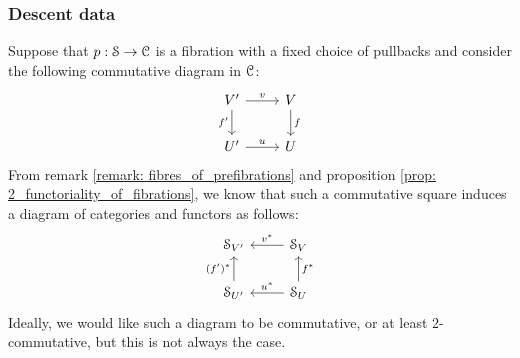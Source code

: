         \subsubsection{Descent data}
            Suppose that $p: \mathcal{S} \to \mathcal{C}$ is a fibration with a fixed choice of pullbacks and consider the following commutative diagram in $\mathcal{C}$:
                $$
                    \begin{tikzcd}
                    	{V'} & V \\
                    	{U'} & U
                    	\arrow["{f'}"', from=1-1, to=2-1]
                    	\arrow["u", from=2-1, to=2-2]
                    	\arrow["v", from=1-1, to=1-2]
                    	\arrow["f", from=1-2, to=2-2]
                    \end{tikzcd}
                $$
            From remark \ref{remark: fibres_of_prefibrations} and proposition \ref{prop: 2_functoriality_of_fibrations}, we know that such a commutative square induces a diagram of categories and functors as follows:
                $$
                    \begin{tikzcd}
                    	{\S_{V'}} & {\S_V} \\
                    	{\S_{U'}} & {\S_U}
                    	\arrow["u^*"', from=2-2, to=2-1]
                    	\arrow["f^*"', from=2-2, to=1-2]
                    	\arrow["v^*"', from=1-2, to=1-1]
                    	\arrow["{(f')^*}", from=2-1, to=1-1]
                    \end{tikzcd}
                $$
            Ideally, we would like such a diagram to be commutative, or at least $2$-commutative, but this is not always the case. 
